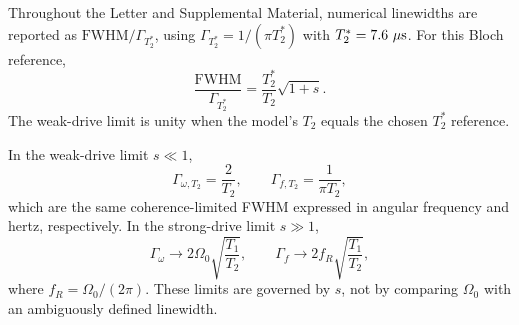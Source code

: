 Throughout the Letter and Supplemental Material, numerical linewidths are
reported as $\mathrm{FWHM}/\Gamma_{T_2^*}$, using
$\Gamma_{T_2^*}=1/(\pi T_2^*)$ with $T_2^*=7.6~\mu\mathrm{s}$.
For this Bloch reference,
\begin{equation}
    \frac{\mathrm{FWHM}}{\Gamma_{T_2^*}}
    =\frac{T_2^*}{T_2}\sqrt{1+s}.
\end{equation}
The weak-drive limit is unity when the model's $T_2$ equals the chosen
$T_2^*$ reference.

In the weak-drive limit $s\ll1$,
\begin{equation}
    \Gamma_{\omega,T_2}=\frac{2}{T_2},
    \qquad
    \Gamma_{f,T_2}=\frac{1}{\pi T_2},
    \label{eq:t2-limited-angular-linewidth}
\end{equation}
which are the same coherence-limited FWHM expressed in angular frequency and
hertz, respectively.  In the strong-drive limit $s\gg1$,
\begin{equation}
    \Gamma_\omega
    \longrightarrow
    2\Omega_0\sqrt{\frac{T_1}{T_2}},
    \qquad
    \Gamma_f
    \longrightarrow
    2f_R\sqrt{\frac{T_1}{T_2}},
    \label{eq:power-broadened-linewidth}
\end{equation}
where $f_R=\Omega_0/(2\pi)$.  These limits are governed by $s$, not by
comparing $\Omega_0$ with an ambiguously defined linewidth.
